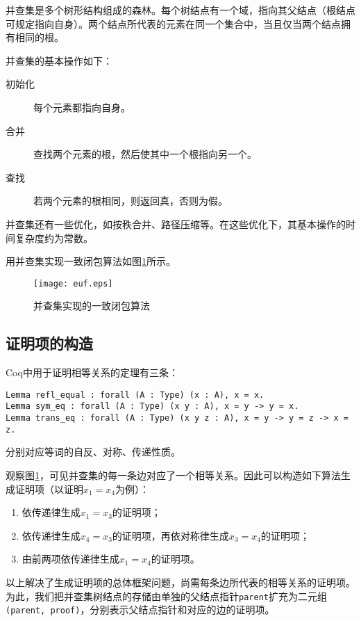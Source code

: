 并查集是多个树形结构组成的森林。每个树结点有一个域，指向其父结点（根结点可规定指向自身）。两个结点所代表的元素在同一个集合中，当且仅当两个结点拥有相同的根。

并查集的基本操作如下：
\begin{description}
  \item[初始化] 每个元素都指向自身。
  \item[合并] 查找两个元素的根，然后使其中一个根指向另一个。
  \item[查找] 若两个元素的根相同，则返回真，否则为假。
\end{description}

并查集还有一些优化，如按秩合并、路径压缩等。在这些优化下，其基本操作的时间复杂度约为常数。

用并查集实现一致闭包算法如图\ref{euf:set}所示。
\begin{figure}[!htbp]
  \centering
  \texttt{[image: euf.eps]}
  \caption{并查集实现的一致闭包算法}
  \label{euf:set}
\end{figure}

\subsection{证明项的构造}
Coq中用于证明相等关系的定理有三条：
\begin{verbatim}
Lemma refl_equal : forall (A : Type) (x : A), x = x.
Lemma sym_eq : forall (A : Type) (x y : A), x = y -> y = x.
Lemma trans_eq : forall (A : Type) (x y z : A), x = y -> y = z -> x = z.
\end{verbatim}
分别对应等词的自反、对称、传递性质。

观察图\ref{euf:set}，可见并查集的每一条边对应了一个相等关系。因此可以构造如下算法生成证明项（以证明$x_1=x_4$为例）：
\begin{enumerate}
  \item 依传递律生成$x_1=x_3$的证明项；
  \item 依传递律生成$x_4=x_3$的证明项，再依对称律生成$x_3=x_4$的证明项；
  \item 由前两项依传递律生成$x_1=x_4$的证明项。
\end{enumerate}

以上解决了生成证明项的总体框架问题，尚需每条边所代表的相等关系的证明项。为此，我们把并查集树结点的存储由单独的父结点指针\texttt{parent}扩充为二元组\texttt{(parent, proof)}，分别表示父结点指针和对应的边的证明项。

